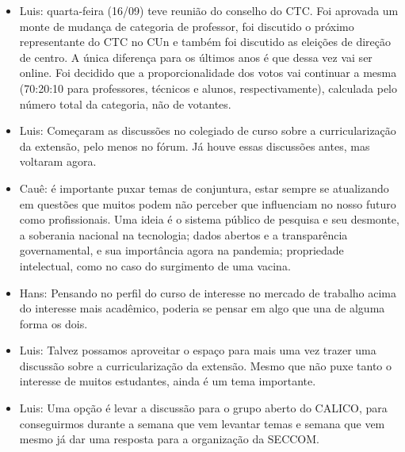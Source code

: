 \documentclass{ata-calico}
\begin{document}
\maketitle

\begin{itemize}
\item Luis: quarta-feira (16/09) teve reunião do conselho do CTC. Foi aprovada um monte de mudança de categoria de professor, foi discutido o próximo representante do CTC no CUn e também foi discutido as eleições de direção de centro. A única diferença para os últimos anos é que dessa vez vai ser online. Foi decidido que a proporcionalidade dos votos vai continuar a mesma (70:20:10 para professores, técnicos e alunos, respectivamente), calculada pelo número total da categoria, não de votantes.
\item Luis: Começaram as discussões no colegiado de curso sobre a curricularização da extensão, pelo menos no fórum. Já houve essas discussões antes, mas voltaram agora.
\end{itemize}

\begin{itemize}
\item Cauê: é importante puxar temas de conjuntura, estar sempre se atualizando em questões que muitos podem não perceber que influenciam no nosso futuro como profissionais. Uma ideia é o sistema público de pesquisa e seu desmonte, a soberania nacional na tecnologia; dados abertos e a transparência governamental, e sua importância agora na pandemia; propriedade intelectual, como no caso do surgimento de uma vacina.
\item Hans: Pensando no perfil do curso de interesse no mercado de trabalho acima do interesse mais acadêmico, poderia se pensar em algo que una de alguma forma os dois.
\item Luis: Talvez possamos aproveitar o espaço para mais uma vez trazer uma discussão sobre a curricularização da extensão. Mesmo que não puxe tanto o interesse de muitos estudantes, ainda é um tema importante.
\item Luis: Uma opção é levar a discussão para o grupo aberto do CALICO, para conseguirmos durante a semana que vem levantar temas e semana que vem mesmo já dar uma resposta para a organização da SECCOM.
\end{itemize}
\end{document}
